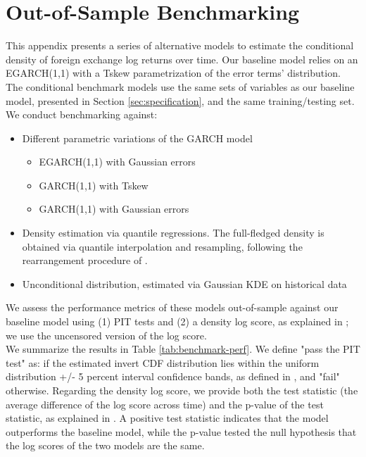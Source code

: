 \documentclass[11pt]{article}
\begin{document}
\clearpage

\section{Out-of-Sample Benchmarking}
\label{sec:benchmarking}

This  appendix  presents  a  series  of alternative  models  to  estimate  the
conditional density of  foreign exchange log returns over  time.  Our baseline
model  relies on  an EGARCH(1,1)  with a  Tskew parametrization  of the  error
terms’ distribution.   The conditional benchmark  models use the same  sets of
variables as our baseline model, presented in Section \ref{sec:specification},
and the same training/testing set.\\

We conduct benchmarking against:

\begin{itemize}
\item Different parametric variations of the GARCH model
  \begin{itemize}
  \item EGARCH(1,1) with Gaussian errors
  \item GARCH(1,1) with Tskew
  \item GARCH(1,1) with Gaussian errors
  \end{itemize}
\item Density estimation via quantile regressions. The full-fledged density is
  obtained via quantile interpolation and resampling, following the
  rearrangement procedure of \cite{chernozhukov2010}.
\item Unconditional distribution, estimated via Gaussian KDE on historical data
\end{itemize}

We assess  the performance metrics  of these models out-of-sample  against our
baseline model using (1)  PIT tests and (2) a density  log score, as explained
in \cite{diks2011}; we use the uncensored version of the log score.\\

We summarize  the results in  Table \ref{tab:benchmark-perf}. We  define "pass
the PIT  test" as: if  the estimated invert  CDF distribution lies  within the
uniform distribution  +/- 5 percent  interval confidence bands, as  defined in
\cite{rossi2019}, and "fail"  otherwise.  Regarding the density  log score, we
provide  both the  test statistic  (the average  difference of  the log  score
across  time)  and  the  p-value  of  the  test  statistic,  as  explained  in
\cite{diks2011}.   A   positive  test  statistic  indicates   that  the  model
outperforms the baseline  model, while the p-value tested  the null hypothesis
that the log scores of the two models are the same.\\
\end{document}
